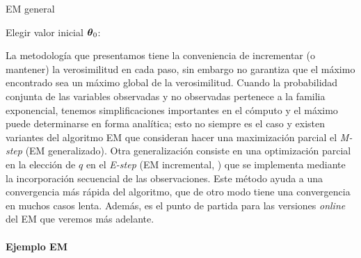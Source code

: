 \begin{algorithm}[h]
\caption{EM general}
\label{algo:general_EM}
    Elegir valor inicial $\mbox{\boldmath$ \theta $}_0$: \\
\end{algorithm}

La metodología que presentamos tiene la conveniencia de incrementar (o mantener) la verosimilitud en cada paso, sin embargo no garantiza que el máximo encontrado sea un máximo global de la verosimilitud. Cuando la probabilidad conjunta de las variables observadas y no observadas pertenece a la familia exponencial, tenemos simplificaciones importantes en el cómputo y el máximo puede determinarse en forma analítica; esto no siempre es el caso y existen variantes del algoritmo EM que consideran hacer una maximización parcial el \textit{M-step} (EM generalizado). Otra generalización consiste en una optimización parcial en la elección de $q$ en el \textit{E-step} (EM incremental, \cite{Neal1998}) que se implementa mediante la incorporación secuencial de las observaciones. Este método ayuda a una convergencia más rápida del algoritmo, que de otro modo tiene una convergencia en muchos casos lenta. Además, es el punto de partida para las versiones \textit{online} del EM que veremos más adelante.

\paragraph{Ejemplo EM}

